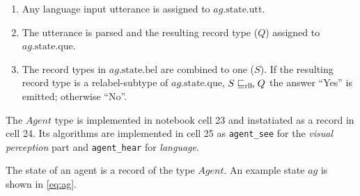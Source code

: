 \begin{enumerate}
\item Any language input utterance is assigned to $ag.\text{state.utt}$.
\item The utterance is parsed and the resulting record type ($Q$) assigned to $ag.\text{state.que}$.
\item The record types in $ag.\text{state.bel}$ are combined to one ($S$).
If the resulting record type is a relabel-subtype of $ag.\text{state.que}$, $S \mathrel{\sqsubseteq_\text{rlb}} Q$ the answer ``Yes'' is emitted; otherwise ``No''.
\end{enumerate}

The $Agent$ type is implemented in notebook cell 23 and instatiated as a record in cell 24.
Its algorithms are implemented in cell 25 as \texttt{agent\_see} for the \textit{visual perception} part and \texttt{agent\_hear} for \textit{language}.

The state of an agent is a record of the type $Agent$.
An example state $ag$ is shown in \autoref{eq:ag}.

